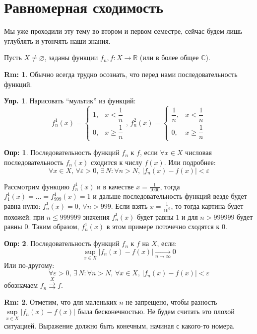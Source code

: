 \documentclass[12pt]{article}
\newcommand{\RN}[1]{%
	\textup{\uppercase\expandafter{\romannumeral#1}}%
}
\newcommand{\MR}{\mathbb{R}}
\newcommand{\MC}{\mathbb{C}}
\newcommand{\VN}{\varnothing}
\newcommand{\VE}{\varepsilon}
\theoremstyle{definition}
\newtheorem{defn}{Опр:}
\newtheorem{rem}{Rm:}
\newtheorem{exrc}{Упр.}
\begin{document}
\lhead{Математический анализ - \RN{3}}
\section*{Равномерная сходимость}
Мы уже проходили эту тему во втором и первом семестре, сейчас будем лишь углублять и утончять наши знания. 

Пусть $X \neq \VN$, заданы функции $f_n, f \colon X \to \MR$ (или в более общее $\MC$).
\begin{rem}
	Обычно всегда трудно осознать, что перед нами последовательность функций.
\end{rem}
\begin{exrc}
	Нарисовать ``мультик'' из функций:
	$$
		f_n^1(x) = 
		\begin{cases}
			1, & x < \dfrac{1}{n}\\[10pt]
			0, & x \geq \dfrac{1}{n}
		\end{cases}, \, 
		f_n^2(x) = 
		\begin{cases}
			\dfrac{1}{n}, & x < \dfrac{1}{n}\\[10pt]
			0, & x \geq \dfrac{1}{n}
		\end{cases}
	$$
\end{exrc}
\begin{defn}
	Последовательность функций $f_n$  к $f$, если $\forall x \in X$ числовая последовательность $f_n(x)$ сходится к числу $f(x)$. Или подробнее:
	$$
		\forall x \in X, \, \forall \VE > 0, \, \exists \, N \colon \forall n > N, \, |f_n(x) - f(x)| < \VE
	$$
\end{defn}
Рассмотрим функцию $f_n^1(x)$ и в качестве $x = \tfrac{1}{1000}$, тогда $f_1^1(x) = \dotsc = f_{999}^1(x) = 1$ и дальше последовательность функций везде будет равна нулю: $f_{n}^1(x) = 0,\, \forall n > 999$. Если взять $x = \tfrac{1}{10^6}$, то тогда картина будет похожей: при $n \leq 999999$ значения $f_n^1(x)$ будет равны $1$ и для $n > 999999$ будет равны $0$. Таким образом, $f_n^1(x)$ в этом примере поточечно сходятся к $0$.

\begin{defn}
	Последовательность функций $f_n$  к $f$ на $X$, если:
	$$
		\sup\limits_{x \in X}\left|f_n(x) - f(x)\right| \xrightarrow[n \to \infty]{} 0
	$$
	Или по-другому:
	$$
		\forall \VE > 0, \, \exists \, N \colon \forall n > N, \, \forall x \in X, \, |f_n(x) - f(x)| < \VE
	$$
	обозначаем $f_n \overset{X}{\rightrightarrows} f$. 
\end{defn}
\begin{rem}
	Отметим, что для маленьких $n$ не запрещено, чтобы разность $\sup\limits_{x \in X}\left|f_n(x) - f(x)\right|$ была бесконечностью. Не будем считать это плохой ситуацией. Выражение должно быть конечным, начиная с какого-то номера.
\end{rem}
\end{document}
